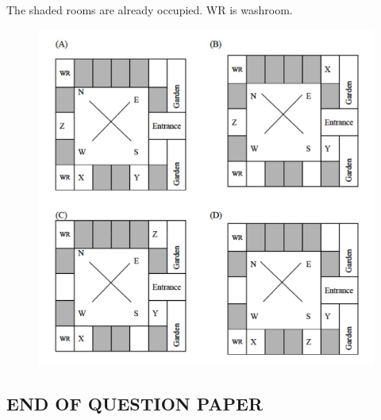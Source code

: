 \documentclass[journal,12pt,onecolumn]{IEEEtran}
\theoremstyle{remark}
\begin{document}
\begin{enumerate}
The shaded rooms are already occupied. WR is washroom.

 \hfill{}
\begin{figure}[H]
    \centering
    \includegraphics[width=0.9\linewidth]{Fig/10i.png}
    \caption{}
    \label{fig:10i}
\end{figure}
\end{enumerate}
\begin{center}
    \subsection*{END OF QUESTION PAPER}
\end{center}
\newpage
\end{document}
